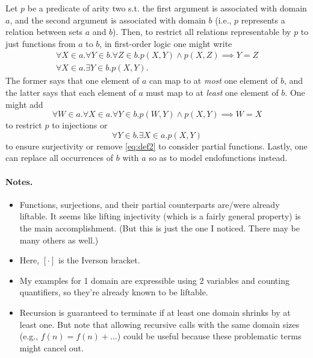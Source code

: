 Let $p$ be a predicate of arity two s.t. the first argument is associated with
domain $a$, and the second argument is associated with domain $b$ (i.e., $p$
represents a relation between sets $a$ and $b$). Then, to restrict all relations
representable by $p$ to just functions from $a$ to $b$, in first-order logic one
might write
\begin{gather}
  \forall X \in a. \forall Y \in b. \forall Z \in b. p(X, Y) \land p(X, Z) \implies Y = Z \label{eq:def1} \\
  \forall X \in a. \exists Y \in b. p(X, Y). \label{eq:def2}
\end{gather}
The former says that one element of $a$ can map to at \emph{most} one element of
$b$, and the latter says that each element of $a$ must map to at \emph{least}
one element of $b$. One might add
\begin{equation} \label{eq:injectivity}
  \forall W \in a. \forall X \in a. \forall Y \in b. p(W, Y) \land p(X, Y) \implies W = X
\end{equation}
to restrict $p$ to injections or
\begin{equation}
  \forall Y \in b. \exists X \in a. p(X, Y)
\end{equation}
to ensure surjectivity or remove \cref{eq:def2} to consider partial functions.
Lastly, one can replace all occurrences of $b$ with $a$ so as to model
endofunctions instead.

\paragraph{Notes.}
\begin{itemize}
  \item Functions, surjections, and their partial counterparts are/were already
        liftable. It seems like lifting injectivity (which is a fairly general
        property) is the main accomplishment. (But this is just the one I
        noticed. There may be many others as well.)
  \item Here, $[\cdot]$ is the Iverson bracket.
  \item My examples for 1 domain are expressible using 2 variables and counting
        quantifiers, so they're already known to be liftable.
  \item Recursion is guaranteed to terminate if at least one domain shrinks by
        at least one. But note that allowing recursive calls with the same
        domain sizes (e.g., $f(n) = f(n) + \dots$) could be useful because these
        problematic terms might cancel out.
\end{itemize}

